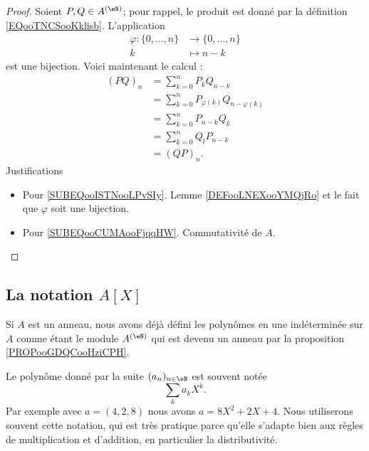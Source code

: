 \begin{proof}
    Soient \( P,Q\in A^{(\eN)}\); pour rappel, le produit est donné par la définition \ref{EQooTNCSooKklisb}. L'application
    \begin{equation}
        \begin{aligned}
            \varphi\colon \{ 0,\ldots, n \}&\to \{ 0,\ldots, n \} \\
            k&\mapsto n-k 
        \end{aligned}
    \end{equation}
    est une bijection. Voici maintenant le calcul :
    \begin{subequations}
        \begin{align}
            (PQ)_n&=\sum_{k=0}^nP_kQ_{n-k}\\
            &=\sum_{k=0}^nP_{\varphi(k)}Q_{n-\varphi(k)}    \label{SUBEQooISTNooLPvSIy} \\
            &=\sum_{k=0}^nP_{n-k}Q_{k}\\
            &=\sum_{k=0}^nQ_lP_{n-k}      \label{SUBEQooCUMAooFjqqHW}\\
            &=(QP)_n.
        \end{align}
    \end{subequations}
    Justifications
    \begin{itemize}
        \item Pour \eqref{SUBEQooISTNooLPvSIy}. Lemme \ref{DEFooLNEXooYMQjRo} et le fait que \( \varphi\) soit une bijection.
        \item Pour \eqref{SUBEQooCUMAooFjqqHW}. Commutativité de \( A\).
    \end{itemize}
\end{proof}


\subsection{La notation \texorpdfstring{$ A[X]$}{A[X]}}
\label{SUBSECooLEKVooFBPSJz}

Si \( A\) est un anneau, nous avons déjà défini les polynômes en une indéterminée sur \( A\) comme étant le module \( A^{(\eN)}\) qui est devenu un anneau par la proposition \ref{PROPooGDQCooHziCPH}.

Le polynôme donné par la suite \( (a_n)_{n\in \eN}\) est souvent notée
\begin{equation}
    \sum_ka_kX^k.
\end{equation}
Par exemple avec \( a=(4,2,8)\) nous avons \( a=8X^2+2X+4\). Nous utiliserons souvent cette notation, qui est très pratique parce qu'elle s'adapte bien aux règles de multiplication et d'addition, en particulier la distributivité.

